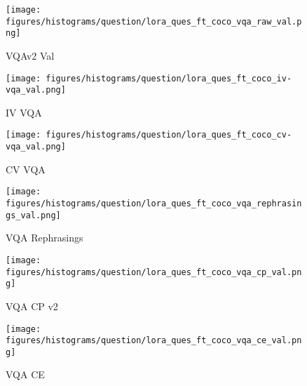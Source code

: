 \begin{figure*}[!h]
    \centering

    \begin{subfigure}[b]{0.3\linewidth}
        \centering
        \texttt{[image: figures/histograms/question/lora\_ques\_ft\_coco\_vqa\_raw\_val.png]}
        \caption{VQAv2 Val}
        \label{fig:vqvqav2_val}
    \end{subfigure}
    \hfill
    \begin{subfigure}[b]{0.3\linewidth}
        \centering
        \texttt{[image: figures/histograms/question/lora\_ques\_ft\_coco\_iv-vqa\_val.png]}
        \caption{IV VQA}
        \label{fig:vqivvqa}
    \end{subfigure}
    \hfill
    \begin{subfigure}[b]{0.3\linewidth}
        \centering
        \texttt{[image: figures/histograms/question/lora\_ques\_ft\_coco\_cv-vqa\_val.png]}
        \caption{CV VQA}
        \label{fig:vqcvvqa}
    \end{subfigure}

    \vspace{0.5cm} %

    \begin{subfigure}[b]{0.3\linewidth}
        \centering
        \texttt{[image: figures/histograms/question/lora\_ques\_ft\_coco\_vqa\_rephrasings\_val.png]}
        \caption{VQA Rephrasings}
        \label{fig:vqvqa_rephrasings}
    \end{subfigure}
    \hfill
    \begin{subfigure}[b]{0.3\linewidth}
        \centering
        \texttt{[image: figures/histograms/question/lora\_ques\_ft\_coco\_vqa\_cp\_val.png]}
        \caption{VQA CP v2}
        \label{fig:vqvqa_cp_v2}
    \end{subfigure}
    \hfill
    \begin{subfigure}[b]{0.3\linewidth}
        \centering
        \texttt{[image: figures/histograms/question/lora\_ques\_ft\_coco\_vqa\_ce\_val.png]}
        \caption{VQA CE}
        \label{fig:vqvqa_ce}
    \end{subfigure}

    \vspace{0.5cm} %


\end{figure*}
